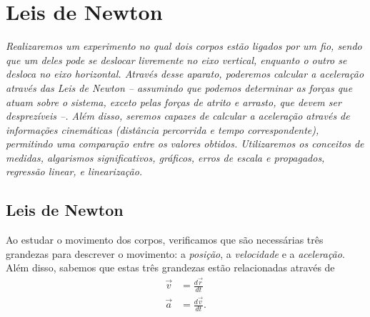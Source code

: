 \chapter{Leis de Newton}
\label{Chap:ExpLeisDeNewton}

\begin{fullwidth}\it
	Realizaremos um experimento no qual dois corpos estão ligados por um fio, sendo que um deles pode se deslocar livremente no eixo vertical, enquanto o outro se desloca no eixo horizontal. Através desse aparato, poderemos calcular a aceleração através das Leis de Newton -- assumindo que podemos determinar as forças que atuam sobre o sistema, exceto pelas forças de atrito e arrasto, que devem ser desprezíveis --. Além disso, seremos capazes de calcular a aceleração através de informações cinemáticas (distância percorrida e tempo correspondente), permitindo uma comparação entre os valores obtidos. Utilizaremos os conceitos de medidas, algarismos significativos, gráficos, erros de escala e propagados, regressão linear, e linearização.
\end{fullwidth}

\section{Leis de Newton}

Ao estudar o movimento dos corpos, verificamos que são necessárias três grandezas para descrever o movimento: a \emph{posição}, a \emph{velocidade} e a \emph{aceleração}. Além disso, sabemos que estas três grandezas estão relacionadas através de
\begin{align}
	\vec{v} &= \frac{d\vec{r}}{dt} \\
	\vec{a} &= \frac{d\vec{v}}{dt}.
\end{align}

